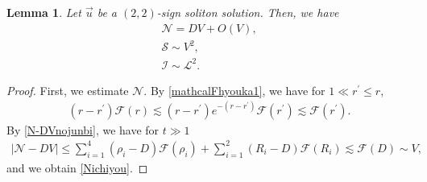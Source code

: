 \documentclass[10pt,a4paper]{amsart}
\newtheorem{lemma}[theorem]{Lemma}
\numberwithin{equation}{section}
\begin{document}
\begin{lemma}\label{mathcalichiyou}
Let $\vec{u}$ be a $(2,2)$-sign soliton solution. Then, we have
\begin{align}
\mathcal{N}=DV+O(V),\label{Nichiyou}
\\
\mathcal{S}\sim V^2,\label{Sichiyou}
\\
\mathcal{I}\sim \mathcal{L}^2.\label{Lichiyou}
\end{align}
\end{lemma}
\begin{proof}
First, we estimate $\mathcal{N}$. By \eqref{mathcalFhyouka1}, we have for $1\ll r^{\prime}\leq r$,
\begin{align}\label{N-DVnojunbi}
\left(r-r^{\prime}\right)\mathcal{F}(r)\lesssim \left(r-r^{\prime}\right)e^{-(r-r^{\prime})}\mathcal{F}(r^{\prime})\lesssim \mathcal{F}(r^{\prime}).
\end{align}
By \eqref{N-DVnojunbi}, we have for $t\gg 1$
\begin{align*}
\left|\mathcal{N}-DV\right|\leq\sum_{i=1}^4 (\rho_i-D)\mathcal{F}(\rho_i)+\sum_{i=1}^2\left(R_i-D\right)\mathcal{F}(R_i)\lesssim \mathcal{F}(D)\sim V,
\end{align*}
and we obtain \eqref{Nichiyou}.


\end{proof}
\end{document}
